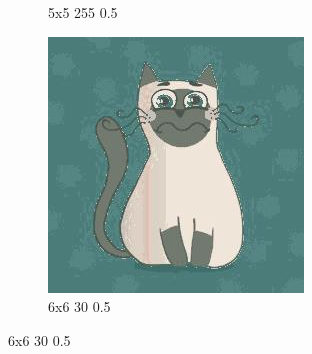 \documentclass[12pt,a4paper]{article}
\begin{document}
\begin{figure}[H]
\begin{subfigure}{0.25\textwidth}
  \caption{5x5 255 0.5}
  \label{fig:5}
\end{subfigure}\hfil %
\begin{subfigure}{0.25\textwidth}
  \includegraphics[width=\linewidth]{images/cartoon/6-6-30-05}
  \caption{6x6 30 0.5}
  \label{fig:6}
\end{subfigure}


\end{figure}
\end{document}
